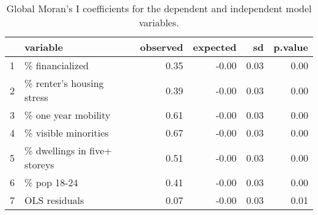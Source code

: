\begin{table}[ht]
\centering
\begin{tabular}{rlrrrr}
  \hline
 & variable & observed & expected & sd & p.value \\ 
  \hline
1 & \% financialized & 0.35 & -0.00 & 0.03 & 0.00 \\ 
  2 & \% renter's housing stress & 0.39 & -0.00 & 0.03 & 0.00 \\ 
  3 & \% one year mobility & 0.61 & -0.00 & 0.03 & 0.00 \\ 
  4 & \% visible minorities & 0.67 & -0.00 & 0.03 & 0.00 \\ 
  5 & \% dwellings in five+ storeys & 0.51 & -0.00 & 0.03 & 0.00 \\ 
  6 & \% pop 18-24 & 0.41 & -0.00 & 0.03 & 0.00 \\ 
  7 & OLS residuals & 0.07 & -0.00 & 0.03 & 0.01 \\ 
   \hline
\end{tabular}
\caption{Global Moran's I coefficients for the dependent and independent model variables.} 
\end{table}

